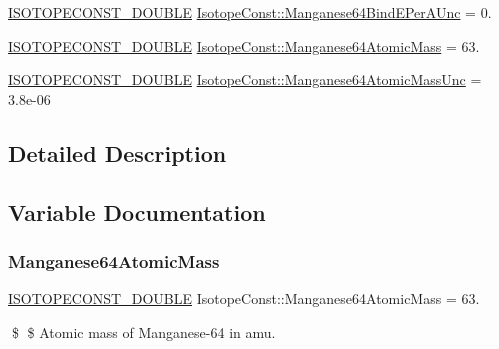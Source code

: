 \begin{DoxyCompactItemize}
\mbox{\hyperlink{group___isotope_const-_macros_ga8f45a7272ce02c0b4c65c44636ed719a}{I\+S\+O\+T\+O\+P\+E\+C\+O\+N\+S\+T\+\_\+\+D\+O\+U\+B\+LE}} \mbox{\hyperlink{group___isotope_const-_manganese-_mn64_gabd50ba6e783c2aba15d948e136b77d98}{Isotope\+Const\+::\+Manganese64\+Bind\+E\+Per\+A\+Unc}} = 0.
\item 
\mbox{\hyperlink{group___isotope_const-_macros_ga8f45a7272ce02c0b4c65c44636ed719a}{I\+S\+O\+T\+O\+P\+E\+C\+O\+N\+S\+T\+\_\+\+D\+O\+U\+B\+LE}} \mbox{\hyperlink{group___isotope_const-_manganese-_mn64_ga95bfeb56e515be3b4c3446c93f44e311}{Isotope\+Const\+::\+Manganese64\+Atomic\+Mass}} = 63.
\item 
\mbox{\hyperlink{group___isotope_const-_macros_ga8f45a7272ce02c0b4c65c44636ed719a}{I\+S\+O\+T\+O\+P\+E\+C\+O\+N\+S\+T\+\_\+\+D\+O\+U\+B\+LE}} \mbox{\hyperlink{group___isotope_const-_manganese-_mn64_ga17acecac5e87c0fa5d0ee67472d9caba}{Isotope\+Const\+::\+Manganese64\+Atomic\+Mass\+Unc}} = 3.\+8e-\/06
\end{DoxyCompactItemize}


\subsection{Detailed Description}


\subsection{Variable Documentation}
\mbox{\label{group___isotope_const-_manganese-_mn64_ga95bfeb56e515be3b4c3446c93f44e311}} 
\subsubsection{\texorpdfstring{Manganese64\+Atomic\+Mass}{Manganese64AtomicMass}}
{\footnotesize\ttfamily \mbox{\hyperlink{group___isotope_const-_macros_ga8f45a7272ce02c0b4c65c44636ed719a}{I\+S\+O\+T\+O\+P\+E\+C\+O\+N\+S\+T\+\_\+\+D\+O\+U\+B\+LE}} Isotope\+Const\+::\+Manganese64\+Atomic\+Mass = 63.}

\$ \$ Atomic mass of Manganese-\/64 in amu. \mbox{\label{group___isotope_const-_manganese-_mn64_ga17acecac5e87c0fa5d0ee67472d9caba}} 
